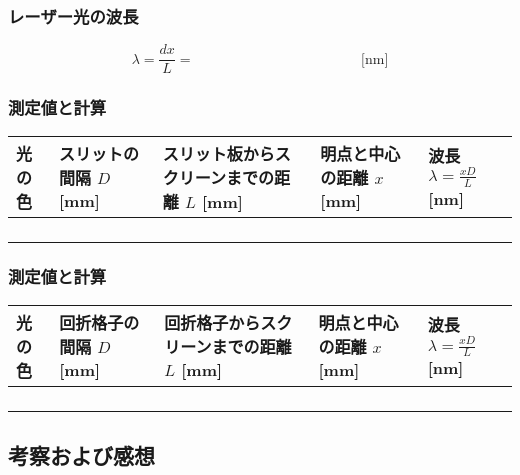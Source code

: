 \subsubsection*{レーザー光の波長}
\begin{equation}
\lambda= \frac{d x}{L}=\hspace{5cm}\text{[nm]}\nonumber
\end{equation}

\bigskip

\subjikken{}
\subsubsection*{測定値と計算}
\hspace*{-\parindent}
\begin{tabular}{|p{1.5cm}|p{3.2cm}|p{3.2cm}|p{3.2cm}|p{3.2cm}|}
\hline
光の色 & スリットの間隔 $D$ [mm] & スリット板からスクリーンまでの距離 $L$ [mm] & 明点と中心の距離 $x$ [mm] & 波長 $\lambda=\frac{xD}{L}$ [nm] \\
\hline\hline
&&&&\\
\hline
&&&&\\
\hline
&&&&\\
\hline
&&&&\\
\hline
\end{tabular}

\bigskip\bigskip\bigskip\bigskip

\subjikken{}
\subsubsection*{測定値と計算}
\hspace*{-\parindent}
\begin{tabular}{|p{1.5cm}|p{3.2cm}|p{3.2cm}|p{3.2cm}|p{3.2cm}|}
\hline
光の色 & 回折格子の間隔 $D$ [mm] & 回折格子からスクリーンまでの距離 $L$ [mm] & 明点と中心の距離 $x$ [mm] & 波長 $\lambda=\frac{xD}{L}$ [nm] \\
\hline\hline
&&&&\\
\hline
&&&&\\
\hline
&&&&\\
\hline
&&&&\\
\hline
\end{tabular}


\newpage

\subsection*{考察および感想}


